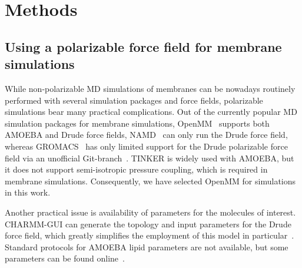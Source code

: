 \documentclass[journal=jctcce,manuscript=article,layout=singlecolumn]{achemso}
\begin{document}
\section{Methods}

\subsection{Using a polarizable force field for membrane simulations}

While non-polarizable MD simulations of membranes can be nowadays routinely performed with several simulation packages and force fields, polarizable simulations bear many practical complications.
Out of the currently popular MD simulation packages for membrane simulations, OpenMM~\cite{eastman2017openmm} supports both AMOEBA and Drude force fields, NAMD~\cite{phillips2020scalable} can only run the Drude force field, whereas GROMACS~\cite{abraham2015gromacs}
has only limited support for the Drude polarizable force field via an unofficial Git-branch~\cite{drudegithub}.  
TINKER is widely used with AMOEBA, but it does not support semi-isotropic pressure coupling, which %
is required in membrane simulations.%
%
Consequently, we have selected OpenMM for simulations in this work.

Another practical issue is availability of parameters for the molecules of interest. CHARMM-GUI can generate the topology and input parameters for the Drude force field, which greatly simplifies the employment of this model in particular~\cite{kognole2022charmm}. Standard protocols for AMOEBA lipid parameters are not available, but some parameters can be found online~\cite{amoebagithub,klesse2020induced}.
\end{document}
